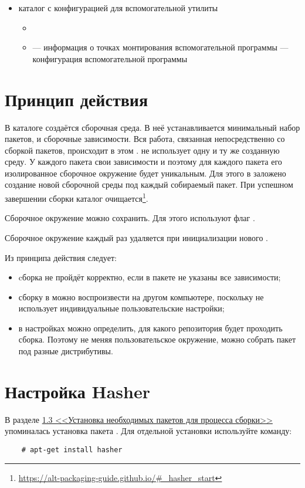 \begin{itemize}
	\item {} каталог с конфигурацией для вспомогательной утилиты 
	\begin{itemize}
		\item {}
		\item {} --- информация о точках монтирования вспомогательной программы 
		 --- конфигурация вспомогательной программы 
	\end{itemize} 
\end{itemize}


\section{Принцип действия}
В каталоге  создаётся сборочная среда. В неё устанавливается минимальный набор пакетов,  и сборочные зависимости. Вся работа, связанная непосредственно со сборкой пакетов, происходит в этом .  не использует одну и ту же созданную среду. У каждого пакета свои зависимости и поэтому для каждого пакета его изолированное сборочное окружение будет уникальным. Для этого в  заложено создание новой сборочной среды под каждый собираемый пакет. При успешном завершении сборки каталог  очищается\footnote{\href{https://alt-packaging-guide.github.io/\#_hasher_start}{https://alt-packaging-guide.github.io/\#\_hasher\_start}}.

Сборочное окружение можно сохранить. Для этого используют флаг .

Сборочное окружение каждый раз удаляется при инициализации нового .

Из принципа действия  следует:
\begin{itemize}
	\item cборка не пройдёт корректно, если в пакете не указаны все зависимости;
	\item сборку в  можно воспроизвести на другом компьютере, поскольку  не использует индивидуальные пользовательские настройки;
	\item в настройках можно определить, для какого репозитория будет проходить сборка. Поэтому не меняя пользовательское окружение, можно собрать пакет под разные дистрибутивы.
\end{itemize}


\section{Настройка Hasher}
В разделе \hyperlink{1.3}{1.3 <<Установка необходимых пакетов для процесса сборки>>}  упоминалась установка пакета . Для отдельной установки используйте команду: 
\begin{verbatim}
	# apt-get install hasher
\end{verbatim}

